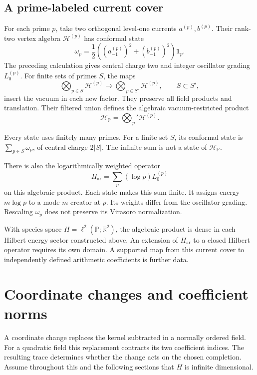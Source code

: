 \subsection{A prime-labeled current cover}

For each prime \(p\), take two orthogonal
level-one currents \(a^{(p)},b^{(p)}\).
Their rank-two vertex algebra
\(\mathcal H^{(p)}\) has conformal state
\[
 \omega_p=\frac12\left(
        (a^{(p)}_{-1})^2+(b^{(p)}_{-1})^2\right)\mathbf1_p.
\]
The preceding calculation gives central
charge two and integer oscillator
grading \(L_0^{(p)}\).
For finite sets of primes \(S\), the
maps
\[
 \bigotimes_{p\in S}\mathcal H^{(p)}
       \longrightarrow
 \bigotimes_{p\in S'}\mathcal H^{(p)},\qquad S\subset S',
\]
insert the vacuum in each new factor.
They preserve all field products and
translation. Their filtered union defines
the algebraic vacuum-restricted product
\[
                \mathcal H_{\mathbb P}
                     =\bigotimes_p'\mathcal H^{(p)}.
\]

Every state uses finitely many primes.
For a finite set \(S\), its conformal
state is \(\sum_{p\in S}\omega_p\),
of central charge \(2|S|\).
The infinite sum is not a state of
\(\mathcal H_{\mathbb P}\).

There is also the logarithmically weighted
operator
\[
                  H_{\mathrm{ar}}
                     =\sum_p(\log p)L_0^{(p)}
\]
on this algebraic product. Each state
makes this sum finite.
It assigns energy \(m\log p\) to
a mode-\(m\) creator at \(p\).
Its weights differ from the oscillator
grading. Rescaling \(\omega_p\) does
not preserve its Virasoro normalization.

With species space
\(H=\ell^2(\mathbb P;\mathbb R^2)\),
the algebraic product is dense in each
Hilbert energy sector constructed above.
An extension of \(H_{\mathrm{ar}}\)
to a closed Hilbert operator requires
its own domain.
A supported map from this current cover
to independently defined arithmetic
coefficients is further data.

\section{Coordinate changes and coefficient norms}
\label{v4-sec:singular-coordinates}

A coordinate change replaces the kernel subtracted
in a normally ordered field. For a quadratic field
this replacement contracts its two coefficient
indices. The resulting trace determines whether
the change acts on the chosen completion.
Assume throughout this and the following sections
that \(H\) is infinite dimensional.

